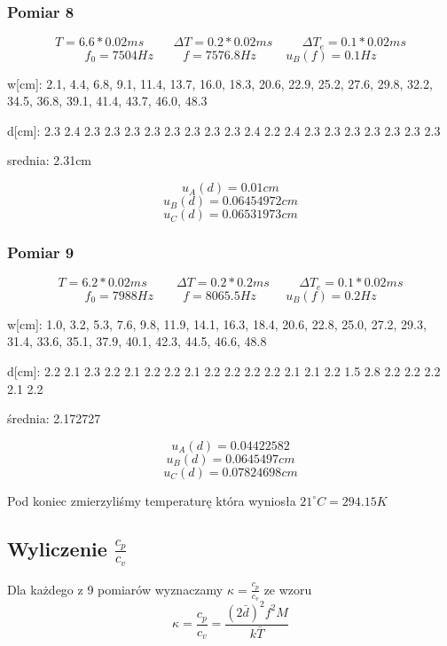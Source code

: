 \documentclass[12pt,a4paper]{article}
\begin{document}
\subsubsection{Pomiar 8}
$$
T = 6.6*0.02ms \hspace{1cm} \Delta T = 0.2*0.02ms \hspace{1cm} \Delta T_e = 0.1*0.02ms 
$$
$$
f_0 = 7504 Hz \hspace{1cm} f=7576.8Hz \hspace{1cm} u_B(f)=0.1Hz
$$

w[cm]: 2.1, 4.4, 6.8, 9.1, 11.4, 13.7, 16.0, 18.3, 20.6, 22.9, 25.2, 27.6, 29.8, 32.2, 34.5, 36.8, 39.1, 41.4, 43.7, 46.0, 48.3

d[cm]: 2.3 2.4 2.3 2.3 2.3 2.3 2.3 2.3 2.3 2.3 2.4 2.2 2.4 2.3 2.3 2.3 2.3 2.3 2.3 2.3

\begin{center}
srednia: 2.31cm
\end{center}

$$
u_A(d) = 0.01cm
$$
$$u_B(d) = 0.06454972cm $$
$$u_C(d) = 0.06531973cm $$
\subsubsection{Pomiar 9}
$$
T = 6.2*0.02ms \hspace{1cm} \Delta T = 0.2*0.2ms \hspace{1cm} \Delta T_e = 0.1*0.02ms 
$$
$$
f_0 = 7988Hz \hspace{1cm} f=8065.5Hz \hspace{1cm} u_B(f)=0.2Hz
$$

w[cm]: 1.0, 3.2, 5.3, 7.6, 9.8, 11.9, 14.1, 16.3, 18.4, 20.6, 22.8, 25.0, 27.2, 29.3, 31.4, 33.6, 35.1, 37.9, 40.1, 42.3, 44.5, 46.6, 48.8

d[cm]: 2.2 2.1 2.3 2.2 2.1 2.2 2.2 2.1 2.2 2.2 2.2 2.2 2.1 2.1 2.2 1.5 2.8 2.2 2.2 2.2 2.1 2.2

\begin{center}

średnia: 2.172727
\end{center}

$$
u_A(d) = 0.04422582
$$
$$u_B(d) = 0.0645497cm $$
$$u_C(d) = 0.07824698cm $$

Pod koniec zmierzyliśmy temperaturę która wyniosła $21^\circ C = 294.15 K$
\subsection{Wyliczenie $\frac{c_p}{c_v}$}

Dla każdego z 9 pomiarów wyznaczamy $\kappa=\frac{c_p}{c_v}$ ze wzoru 
$$
\kappa = \frac{c_p}{c_v} = \frac{(2\bar{d})^2 f^2 M}{k\bar{T}}
$$
\end{document}
